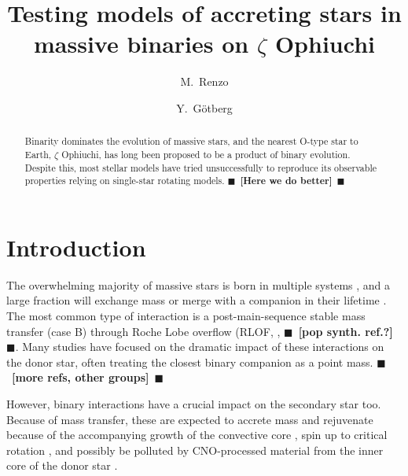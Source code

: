 \documentclass[twocolumn,twocolappendix,trackchanges]{aastex63}
\newcommand{\todo}[1]{{\large $\blacksquare$~\textbf{\color{red}[#1]}}~$\blacksquare$}
\begin{document}
\graphicspath{{./figures/}}


\title{Testing models of accreting stars in
  massive binaries on $\zeta$ Ophiuchi}
\author[0000-0002-6718-9472]{M.~Renzo}

\author{Y.~G\"otberg}


\begin{abstract}
  Binarity dominates the evolution of massive stars, and the nearest
  O-type star to Earth, $\zeta$ Ophiuchi, has long been proposed to be
  a product of binary evolution. Despite this, most stellar models
  have tried unsuccessfully to reproduce its observable properties
  relying on single-star rotating models.  \todo{Here we do better}
\end{abstract}

\vspace*{-10pt}


\section{Introduction}
\label{sec:intro}

The overwhelming majority of massive stars is born in multiple systems
\citep[e.g.,][]{mason:09, almeida:17}, and a large
fraction will exchange mass or merge with a companion in their lifetime \citep[e.g.,][]{sana:12}. The most common type of interaction is a post-main-sequence
stable mass transfer (case B) through Roche Lobe overflow
(RLOF, \citealt{kippenhahn:67}, \todo{pop synth. ref.?}.
Many studies \citep[e.g.][]{gotberg:17, gotberg:18,
  laplace:20, laplace:21} have focused on the dramatic
impact of these interactions on the donor star, often treating the
closest binary companion as a point mass. \todo{more refs, other groups}

However, binary interactions have a crucial impact on the secondary
star too. Because of mass transfer, these are expected to accrete mass
and rejuvenate because of the accompanying growth of the convective
core \citep[e.g.,][]{neo:77, schneider:16}, spin up to critical
rotation \citep[e.g.,][]{packet:81, cantiello:07}, and
possibly be polluted by CNO-processed material from the inner core of
the donor star \citep[e.g.,][]{blaauw:93}.
\end{document}

